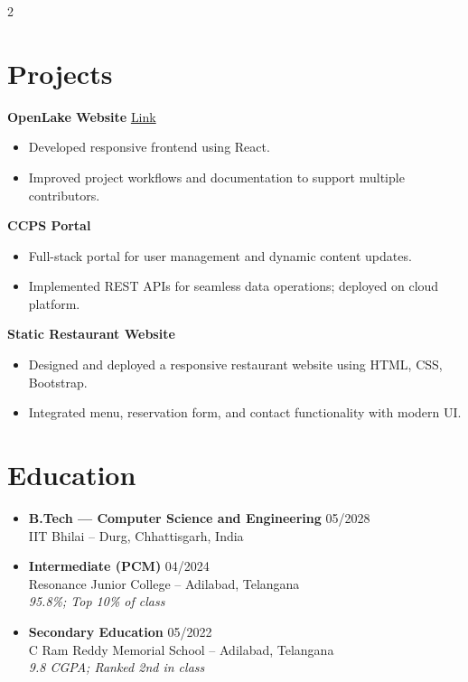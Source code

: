 \documentclass[a4paper,11pt]{article}
\begin{document}
\begin{paracol}{2}
		\section*{Projects}
		\textbf{OpenLake Website} \hfill \href{https://openlakeweb.vercel.app/}{Link}
		\begin{itemize}
			\item Developed responsive frontend using React.
			\item Improved project workflows and documentation to support multiple contributors.
		\end{itemize}
		\textbf{CCPS Portal} 
		\begin{itemize}
			\item Full-stack portal for user management and dynamic content updates.
			\item Implemented REST APIs for seamless data operations; deployed on cloud platform.
		\end{itemize}
		\textbf{Static Restaurant Website} 
		\begin{itemize}
			\item Designed and deployed a responsive restaurant website using HTML, CSS, Bootstrap.
			\item Integrated menu, reservation form, and contact functionality with modern UI.
		\end{itemize}
		
		\switchcolumn
		
		\section*{Education}
		\begin{itemize}
			\item \textbf{B.Tech — Computer Science and Engineering} \hfill 05/2028\\
			IIT Bhilai – Durg, Chhattisgarh, India
			\item \textbf{Intermediate (PCM)} \hfill 04/2024\\
			Resonance Junior College – Adilabad, Telangana\\
			\emph{95.8\%; Top 10\% of class}
			\item \textbf{Secondary Education} \hfill 05/2022\\
			C Ram Reddy Memorial School – Adilabad, Telangana\\
			\emph{9.8 CGPA; Ranked 2nd in class}
		\end{itemize}
		

\end{paracol}
\end{document}
